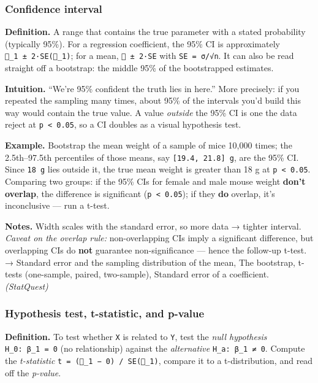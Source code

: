 \documentclass[
  10pt,
  letterpaper,
  onecolumn]{article}
\begin{document}
\hypertarget{confidence-interval}{%
\subsubsection{Confidence interval}\label{confidence-interval}}

\textbf{Definition.} A range that contains the true parameter with a
stated probability (typically 95\%). For a regression coefficient, the
95\% CI is approximately \texttt{\_1\ ±\ 2·SE(\_1)}; for a mean,
\texttt{\ ±\ 2·SE} with \texttt{SE\ =\ σ/√n}. It can also be read
straight off a bootstrap: the middle 95\% of the bootstrapped estimates.

\textbf{Intuition.} ``We're 95\% confident the truth lies in here.''
More precisely: if you repeated the sampling many times, about 95\% of
the intervals you'd build this way would contain the true value. A value
\emph{outside} the 95\% CI is one the data reject at
\texttt{p\ \textless{}\ 0.05}, so a CI doubles as a visual hypothesis
test.

\textbf{Example.} Bootstrap the mean weight of a sample of mice 10,000
times; the 2.5th--97.5th percentiles of those means, say
\texttt{{[}19.4,\ 21.8{]}\ g}, are the 95\% CI. Since \texttt{18\ g}
lies outside it, the true mean weight is greater than 18 g at
\texttt{p\ \textless{}\ 0.05}. Comparing two groups: if the 95\% CIs for
female and male mouse weight \textbf{don't overlap}, the difference is
significant (\texttt{p\ \textless{}\ 0.05}); if they \textbf{do}
overlap, it's inconclusive --- run a t-test.

\textbf{Notes.} Width scales with the standard error, so more data →
tighter interval. \emph{Caveat on the overlap rule:} non-overlapping CIs
imply a significant difference, but overlapping CIs do \textbf{not}
guarantee non-significance --- hence the follow-up t-test. → Standard
error and the sampling distribution of the mean, The bootstrap, t-tests
(one-sample, paired, two-sample), Standard error of a coefficient.
\emph{(StatQuest)}

\hypertarget{hypothesis-test-t-statistic-and-p-value}{%
\subsubsection{Hypothesis test, t-statistic, and
p-value}\label{hypothesis-test-t-statistic-and-p-value}}

\textbf{Definition.} To test whether \texttt{X} is related to
\texttt{Y}, test the \emph{null hypothesis} \texttt{H\_0:\ β\_1\ =\ 0}
(no relationship) against the \emph{alternative}
\texttt{H\_a:\ β\_1\ ≠\ 0}. Compute the \emph{t-statistic}
\texttt{t\ =\ (\_1\ −\ 0)\ /\ SE(\_1)}, compare it to a
t-distribution, and read off the \emph{p-value}.
\end{document}
